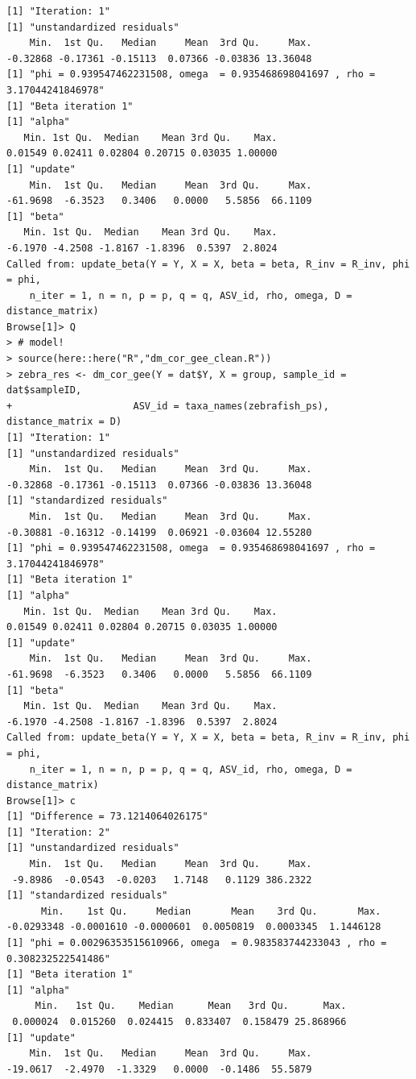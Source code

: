 \documentclass[10pt]{article}
\theoremstyle{definition}
\begin{document}
\begin{itemize}
\begin{verbatim}
[1] "Iteration: 1"
[1] "unstandardized residuals"
    Min.  1st Qu.   Median     Mean  3rd Qu.     Max.
-0.32868 -0.17361 -0.15113  0.07366 -0.03836 13.36048
[1] "phi = 0.939547462231508, omega  = 0.935468698041697 , rho = 3.17044241846978"
[1] "Beta iteration 1"
[1] "alpha"
   Min. 1st Qu.  Median    Mean 3rd Qu.    Max.
0.01549 0.02411 0.02804 0.20715 0.03035 1.00000
[1] "update"
    Min.  1st Qu.   Median     Mean  3rd Qu.     Max.
-61.9698  -6.3523   0.3406   0.0000   5.5856  66.1109
[1] "beta"
   Min. 1st Qu.  Median    Mean 3rd Qu.    Max.
-6.1970 -4.2508 -1.8167 -1.8396  0.5397  2.8024
Called from: update_beta(Y = Y, X = X, beta = beta, R_inv = R_inv, phi = phi,
    n_iter = 1, n = n, p = p, q = q, ASV_id, rho, omega, D = distance_matrix)
Browse[1]> Q
> # model!
> source(here::here("R","dm_cor_gee_clean.R"))
> zebra_res <- dm_cor_gee(Y = dat$Y, X = group, sample_id = dat$sampleID,
+                     ASV_id = taxa_names(zebrafish_ps), distance_matrix = D)
[1] "Iteration: 1"
[1] "unstandardized residuals"
    Min.  1st Qu.   Median     Mean  3rd Qu.     Max.
-0.32868 -0.17361 -0.15113  0.07366 -0.03836 13.36048
[1] "standardized residuals"
    Min.  1st Qu.   Median     Mean  3rd Qu.     Max.
-0.30881 -0.16312 -0.14199  0.06921 -0.03604 12.55280
[1] "phi = 0.939547462231508, omega  = 0.935468698041697 , rho = 3.17044241846978"
[1] "Beta iteration 1"
[1] "alpha"
   Min. 1st Qu.  Median    Mean 3rd Qu.    Max.
0.01549 0.02411 0.02804 0.20715 0.03035 1.00000
[1] "update"
    Min.  1st Qu.   Median     Mean  3rd Qu.     Max.
-61.9698  -6.3523   0.3406   0.0000   5.5856  66.1109
[1] "beta"
   Min. 1st Qu.  Median    Mean 3rd Qu.    Max.
-6.1970 -4.2508 -1.8167 -1.8396  0.5397  2.8024
Called from: update_beta(Y = Y, X = X, beta = beta, R_inv = R_inv, phi = phi,
    n_iter = 1, n = n, p = p, q = q, ASV_id, rho, omega, D = distance_matrix)
Browse[1]> c
[1] "Difference = 73.1214064026175"
[1] "Iteration: 2"
[1] "unstandardized residuals"
    Min.  1st Qu.   Median     Mean  3rd Qu.     Max.
 -9.8986  -0.0543  -0.0203   1.7148   0.1129 386.2322
[1] "standardized residuals"
      Min.    1st Qu.     Median       Mean    3rd Qu.       Max.
-0.0293348 -0.0001610 -0.0000601  0.0050819  0.0003345  1.1446128
[1] "phi = 0.00296353515610966, omega  = 0.983583744233043 , rho = 0.308232522541486"
[1] "Beta iteration 1"
[1] "alpha"
     Min.   1st Qu.    Median      Mean   3rd Qu.      Max.
 0.000024  0.015260  0.024415  0.833407  0.158479 25.868966
[1] "update"
    Min.  1st Qu.   Median     Mean  3rd Qu.     Max.
-19.0617  -2.4970  -1.3329   0.0000  -0.1486  55.5879

\end{verbatim}
\end{itemize}
\end{document}
